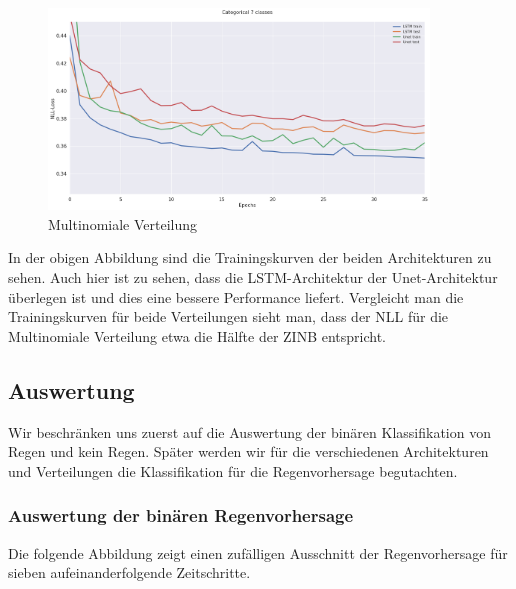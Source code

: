 \begin{figure}[htb]
 \centering
 \includegraphics[width=0.9\textwidth,angle=0]{abb/Categorical.png}
 \caption{Multinomiale Verteilung}
\label{fig:multinomialeVerteilung}
\end{figure}

\noindent In der obigen Abbildung sind die Trainingskurven der beiden Architekturen zu sehen. Auch hier ist zu sehen, dass die LSTM-Architektur der Unet-Architektur überlegen ist und dies eine bessere Performance liefert. Vergleicht man die Trainingskurven für beide Verteilungen sieht man, dass der NLL für die Multinomiale Verteilung etwa die Hälfte der ZINB entspricht.

\newpage
\subsection{Auswertung}

Wir beschränken uns zuerst auf die Auswertung der binären Klassifikation von Regen und kein Regen. Später werden wir für die verschiedenen Architekturen und Verteilungen die Klassifikation für die Regenvorhersage begutachten.


\subsubsection{Auswertung der binären Regenvorhersage}
Die folgende Abbildung zeigt einen zufälligen Ausschnitt der Regenvorhersage für sieben aufeinanderfolgende Zeitschritte.\\

